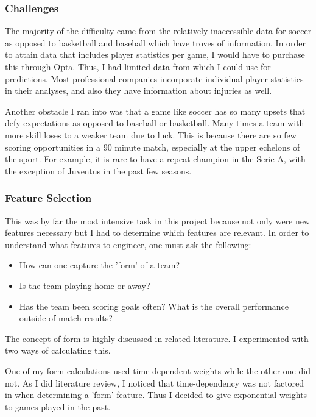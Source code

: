 \documentclass[paper=a4, fontsize=11pt]{scrartcl}
\numberwithin{equation}{section}		%
\numberwithin{figure}{section}			%
\numberwithin{table}{section}				%
\begin{document}
\subsubsection{Challenges}

The majority of the difficulty came from the relatively inaccessible data for soccer as opposed to basketball and baseball which have troves of information. In order to attain data that includes player statistics per game, I would have to purchase this through Opta. Thus, I had limited data from which I could use for predictions. Most professional companies incorporate individual player statistics in their analyses, and also they have information about injuries as well.

Another obstacle I ran into was that a game like soccer has so many upsets that defy expectations as opposed to baseball or basketball. Many times a team with more skill loses to a weaker team due to luck. This is because there are so few scoring opportunities in a 90 minute match, especially at the upper echelons of the sport. For example, it is rare to have a repeat champion in the Serie A, with the exception of Juventus in the past few seasons.

\subsubsection{Feature Selection}

This was by far the most intensive task in this project because not only were new features necessary but I had to determine which features are relevant. In order to understand what features to engineer, one must ask the following:

\begin{itemize}
\item How can one capture the 'form' of a team?
\item Is the team playing home or away?
\item Has the team been scoring goals often? What is the overall performance outside of match results?
\end{itemize}

The concept of form is highly discussed in related literature. I experimented with two ways of calculating this.

One of my form calculations used time-dependent weights while the other one did not. As I did literature review, I noticed that time-dependency was not factored in when determining a 'form' feature. Thus I decided to give exponential weights to games played in the past.
\end{document}

